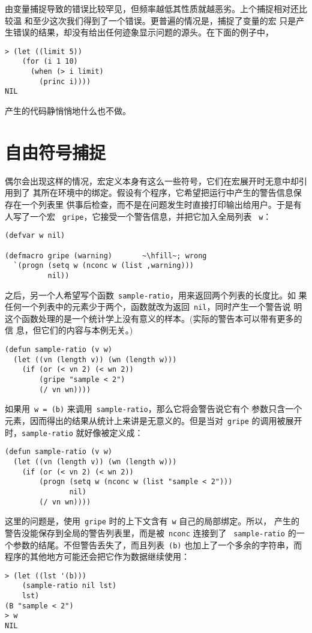 由变量捕捉导致的错误比较罕见，但频率越低其性质就越恶劣。上个捕捉相对还比较温
和\pozhehao{}至少这次我们得到了一个错误。更普遍的情况是，捕捉了变量的宏
只是产生错误的结果，却没有给出任何迹象显示问题的源头。在下面的例子中，
\begin{lstlisting}
> (let ((limit 5))
    (for (i 1 10)
      (when (> i limit)
        (princ i))))
NIL
\end{lstlisting}
产生的代码静悄悄地什么也不做。\label{example:capture}

\section{自由符号捕捉}
\label{sec:free_symbol_capture}

偶尔会出现这样的情况，宏定义本身有这么一些符号，它们在宏展开时无意中却引用到了
其所在环境中的绑定。假设有个程序，它希望把运行中产生的警告信息保存在一个列表里
供事后检查，而不是在问题发生时直接打印输出给用户。于是有人写了一个宏
~\texttt{gripe}\label{macro:gripe}，它接受一个警告信息，并把它加入全局列表
~\texttt{w}：
\begin{lstlisting}[escapechar=\~]
(defvar w nil)

(defmacro gripe (warning)       ~\hfill~; wrong
  `(progn (setq w (nconc w (list ,warning)))
          nil))
\end{lstlisting}
之后，另一个人希望写个函数~\texttt{sample-ratio}，用来返回两个列表的长度比。如
果任何一个列表中的元素少于两个，函数就改为返回~\texttt{nil}，同时产生一个警告说
明这个函数处理的是一个统计学上没有意义的样本。(实际的警告本可以带有更多的信
息，但它们的内容与本例无关。)
\begin{lstlisting}
(defun sample-ratio (v w)
  (let ((vn (length v)) (wn (length w)))
    (if (or (< vn 2) (< wn 2))
        (gripe "sample < 2")
        (/ vn wn))))
\end{lstlisting}
如果用~\texttt{w = (b)} 来调用~\texttt{sample-ratio}，那么它将会警告说它有个
参数只含一个元素，因而得出的结果从统计上来讲是无意义的。但是当对~\texttt{gripe} 的调用被展开
时，\texttt{sample-ratio} 就好像被定义成：
\begin{lstlisting}
(defun sample-ratio (v w)
  (let ((vn (length v)) (wn (length w)))
    (if (or (< vn 2) (< wn 2))
        (progn (setq w (nconc w (list "sample < 2")))
               nil)
        (/ vn wn))))
\end{lstlisting}
这里的问题是，使用~\texttt{gripe} 时的上下文含有~\texttt{w} 自己的局部绑定。所以，
产生的警告没能保存到全局的警告列表里，而是被~\texttt{nconc} 连接到了
~\texttt{sample-ratio} 的一个参数的结尾。不但警告丢失了，而且列表~\texttt{(b)}
也加上了一个多余的字符串，而程序的其他地方可能还会把它作为数据继续使用：
\begin{lstlisting}
> (let ((lst '(b)))
    (sample-ratio nil lst)
    lst)
(B "sample < 2")
> w
NIL
\end{lstlisting}

